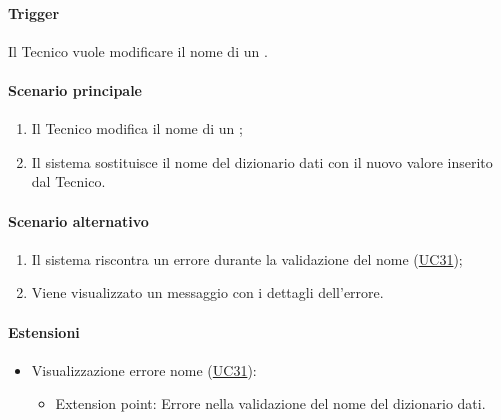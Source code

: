 \paragraph*{Trigger}
Il Tecnico vuole modificare il nome di un .

\paragraph*{Scenario principale}
\begin{enumerate}
  \item Il Tecnico modifica il nome di un ;
  \item Il sistema sostituisce il nome del dizionario dati con il nuovo valore inserito dal Tecnico.
\end{enumerate}

\paragraph*{Scenario alternativo}
\begin{enumerate}
  \item Il sistema riscontra un errore durante la validazione del nome (\hyperref[UC31]{UC31});
  \item Viene visualizzato un messaggio con i dettagli dell'errore.
\end{enumerate}

\paragraph*{Estensioni}
\begin{itemize}
  \item Visualizzazione errore nome  (\hyperref[UC31]{UC31}):
  \begin{itemize}
    \item Extension point: Errore nella validazione del nome del dizionario dati.
  \end{itemize}
\end{itemize}